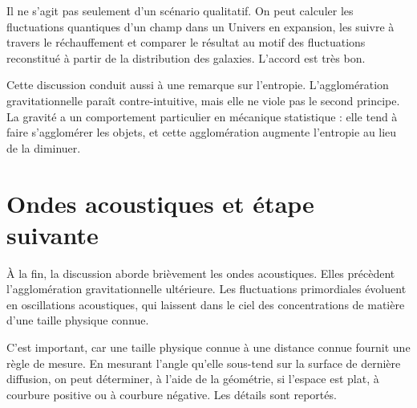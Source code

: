 Il ne s’agit pas seulement d’un scénario qualitatif. On peut calculer les fluctuations quantiques d’un champ dans un Univers en expansion, les suivre à travers le réchauffement et comparer le résultat au motif des fluctuations reconstitué à partir de la distribution des galaxies. L’accord est très bon.

Cette discussion conduit aussi à une remarque sur l’entropie. L’agglomération gravitationnelle paraît contre-intuitive, mais elle ne viole pas le second principe. La gravité a un comportement particulier en mécanique statistique : elle tend à faire s’agglomérer les objets, et cette agglomération augmente l’entropie au lieu de la diminuer.

\begin{classroomqa}
\end{classroomqa}

\section{Ondes acoustiques et étape suivante}

À la fin, la discussion aborde brièvement les ondes acoustiques. Elles précèdent l’agglomération gravitationnelle ultérieure. Les fluctuations primordiales évoluent en oscillations acoustiques, qui laissent dans le ciel des concentrations de matière d’une taille physique connue.

C’est important, car une taille physique connue à une distance connue fournit une règle de mesure. En mesurant l’angle qu’elle sous-tend sur la surface de dernière diffusion, on peut déterminer, à l’aide de la géométrie, si l’espace est plat, à courbure positive ou à courbure négative. Les détails sont reportés.

\begin{classroomqa}
\end{classroomqa}